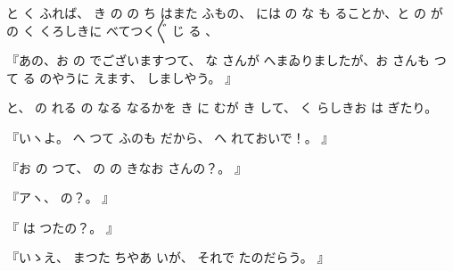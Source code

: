 と
く
ふれば、
き
の
の
ち
はまた
ふもの、
には
の
な
も
ることか、と
の
が
の
く
くろしきに
べてつく〴〵
じ
る
、

『あの、お
の
でございますつて、
な
さんが
へまゐりましたが、お
さんも
つて
る
のやうに
えます、
しましやう。
』

と、
の
れる
の
なる
なるかを
き
に
むが
き
して、
く
らしきお
は
ぎたり。

『いヽよ。
へ
つて
ふのも
だから、
へ
れておいで！。
』

『お
の
つて、
の
の
きなお
さんの？。
』

『アヽ、
の？。
』

『
は
つたの？。
』

『いゝえ、
まつた
ちやあ
いが、
それで
たのだらう。
』

